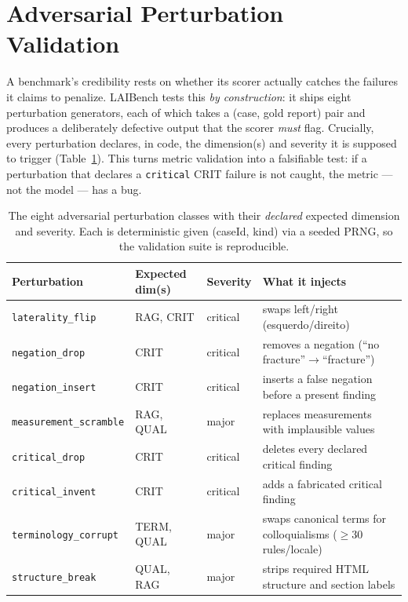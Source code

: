 \documentclass[11pt]{article}
\newcommand{\dimname}[1]{\textsc{#1}}
\begin{document}
\section{Adversarial Perturbation Validation}
\label{sec:perturb}

A benchmark's credibility rests on whether its scorer actually catches the
failures it claims to penalize. LAIBench tests this \emph{by construction}: it
ships eight perturbation generators, each of which takes a (case, gold report)
pair and produces a deliberately defective output that the scorer
\emph{must} flag. Crucially, every perturbation declares, in code, the
dimension(s) and severity it is supposed to trigger (Table~\ref{tab:perturb}).
This turns metric validation into a falsifiable test: if a perturbation that
declares a \texttt{critical} \dimname{CRIT} failure is not caught, the metric ---
not the model --- has a bug.

\begin{table}[t]
\centering
\small
\setlength{\tabcolsep}{5pt}
\renewcommand{\arraystretch}{1.2}
\begin{tabular}{@{}llll@{}}
\toprule
\textbf{Perturbation} & \textbf{Expected dim(s)} & \textbf{Severity} & \textbf{What it injects} \\
\midrule
\texttt{laterality\_flip}      & \dimname{RAG}, \dimname{CRIT} & critical & swaps left/right (esquerdo/direito) \\
\texttt{negation\_drop}        & \dimname{CRIT}                & critical & removes a negation (``no fracture''$\rightarrow$``fracture'') \\
\texttt{negation\_insert}      & \dimname{CRIT}                & critical & inserts a false negation before a present finding \\
\texttt{measurement\_scramble} & \dimname{RAG}, \dimname{QUAL} & major    & replaces measurements with implausible values \\
\texttt{critical\_drop}        & \dimname{CRIT}                & critical & deletes every declared critical finding \\
\texttt{critical\_invent}      & \dimname{CRIT}                & critical & adds a fabricated critical finding \\
\texttt{terminology\_corrupt}  & \dimname{TERM}, \dimname{QUAL}& major    & swaps canonical terms for colloquialisms ($\ge$30 rules/locale) \\
\texttt{structure\_break}      & \dimname{QUAL}, \dimname{RAG} & major    & strips required HTML structure and section labels \\
\bottomrule
\end{tabular}
\caption{The eight adversarial perturbation classes with their \emph{declared}
expected dimension and severity. Each is deterministic given (caseId, kind) via a
seeded PRNG, so the validation suite is reproducible.}
\label{tab:perturb}
\end{table}
\end{document}
